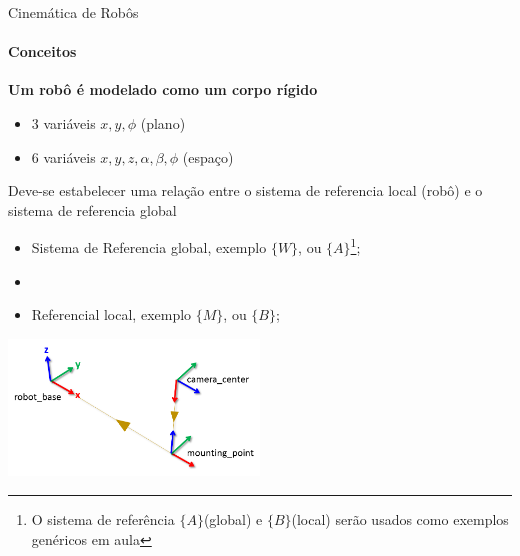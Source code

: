 \documentclass{beamer}
\begin{document}
\begin{frame}{Cinemática de Robôs}
    \framesubtitle{Conceitos}
    \textbf{Um robô é modelado como um corpo rígido}
        \begin{itemize}
            \item 3 variáveis $x, y,\phi$ (plano)
            \item 6 variáveis $x,y,z, \alpha, \beta, \phi$ (espaço)
        \end{itemize}
    Deve-se estabelecer uma relação entre o sistema de referencia local (robô) e o sistema de referencia global
        \begin{itemize}
            \item Sistema de Referencia global, exemplo $\{W\}$, ou $\{A\}$\footnote{O sistema de referência $\{A\}$(global) e $\{B\}$(local) serão usados como exemplos genéricos em aula};
            \item \item Referencial local, exemplo $\{M\}$, ou $\{B\}$;
        \end{itemize}
        \begin{center}
            \includegraphics[width=0.5\textwidth]{./images/tf_1.png}
        \end{center}
\end{frame}
\end{document}
